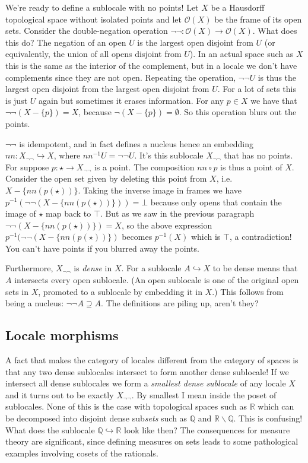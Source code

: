 \documentclass[14pt]{extarticle}
\renewcommand{\o}{\ensuremath{\mathcal{O}}}
\begin{document}
We're ready to define a sublocale with no points! Let $X$ be a Hausdorff topological space without isolated points and let $\o(X)$ be the frame of its open sets. Consider the double-negation operation $\neg\neg:\o(X)\to\o(X)$. What does this do? The negation of an open $U$ is the largest open disjoint from $U$ (or equivalently, the union of all opens disjoint from $U$). In an actual space such as $X$ this is the same as the interior of the complement, but in a locale we don't have complements since they are not open. Repeating the operation, $\neg\neg U$ is thus the largest open disjoint from the largest open disjoint from $U$. For a lot of sets this is just $U$ again but sometimes it erases information. For any $p\in X$ we have that $\neg\neg(X-\{p\}) = X$, because $\neg (X-\{p\})=\emptyset$. So this operation blurs out the points.

$\neg\neg$ is idempotent, and in fact defines a nucleus hence an embedding $nn:X_{\neg\neg}\hookrightarrow X$, where $nn^{-1}U=\neg\neg U$. It's this sublocale $X_{\neg\neg}$ that has no points. For suppose $p:\star\to X_{\neg\neg}$ is a point. The composition $nn\circ p$ is thus a point of $X$. Consider the open set given by deleting this point from $X$, i.e. $X-\{nn(p(\star))\}$. Taking the inverse image in frames we have $p^{-1}(\neg\neg(X-\{nn(p(\star))\})) = \bot$ because only opens that contain the image of $\star$ map back to $\top$. But as we saw in the previous paragraph $\neg\neg(X-\{nn(p(\star))\}) = X$, so the above expression $p^{-1}(\neg\neg(X-\{nn(p(\star))\})$ becomes $p^{-1}(X)$ which is $\top$, a contradiction! You can't have points if you blurred away the points.

Furthermore, $X_{\neg\neg}$ is \emph{dense} in $X$. For a sublocale $A\hookrightarrow X$ to be dense means that $A$ intersects every open sublocale. (An open sublocale is one of the original open sets in $X$, promoted to a sublocale by embedding it in $X$.) This follows from being a nucleus: $\neg\neg A \supseteq A$. The definitions are piling up, aren't they?

\subsection{Locale morphisms}

A fact that makes the category of locales different from the category of spaces is that any two dense sublocales intersect to form another dense sublocale! If we intersect all dense sublocales we form a \emph{smallest dense sublocale} of any locale $X$ and it turns out to be exactly $X_{\neg\neg}$. By smallest I mean inside the poset of sublocales. None of this is the case with topological spaces such as $\mathbb{R}$ which can be decomposed into disjoint dense sub\emph{sets} such as $\mathbb{Q}$ and $\mathbb{R}\backslash\mathbb{Q}$. This is confusing! What does the sublocale $\mathbb{Q}\hookrightarrow\mathbb{R}$ look like then? The consequences for measure theory are significant, since defining measures on sets leads to some pathological examples involving cosets of the rationals.
\end{document}
